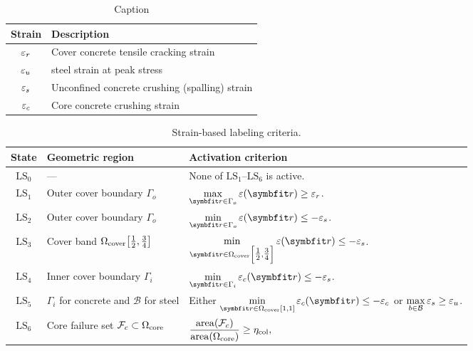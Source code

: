 \begin{table}[H]
    \centering
    \caption{Caption}
    \label{tab:placeholder}
    \begin{tabular}{cl}
    \toprule 
    Strain & Description \\
    \midrule
        $\varepsilon_{r}$ &  Cover concrete tensile cracking strain\\
        $\varepsilon_{u}$ & steel strain at peak stress \\
        $\varepsilon_{s}$ & Unconfined concrete crushing (spalling) strain \\
        $\varepsilon_{c}$ & Core concrete crushing strain \\
    \bottomrule
    \end{tabular}
\end{table}

\begin{table}[H]
\caption{Strain-based labeling criteria.}
\label{tab:DSS}
\small
\setlength{\tabcolsep}{5pt}
\renewcommand{\arraystretch}{1.25}
\begin{tabularx}{\linewidth}{@{}cYY@{}}
\toprule
State & Geometric region & Activation criterion \\
\midrule
$\mathrm{LS}_{0}$
& ---
& None of $\mathrm{LS}_{1}$--$\mathrm{LS}_{6}$ is active. \\

\addlinespace[2pt]
$\mathrm{LS}_{1}$
& Outer cover boundary \(\Gamma_o\)
& \(\displaystyle \max_{\bm r\in\Gamma_o}\varepsilon(\bm r)\ge \StrainCoverCrack\). \\

\addlinespace[2pt]
$\mathrm{LS}_{2}$
& Outer cover boundary \(\Gamma_o\)
& \(\displaystyle \min_{\bm r\in\Gamma_o}\varepsilon(\bm r)\le -\StrainCoverCrush\). \\

\addlinespace[2pt]
$\mathrm{LS}_{3}$
& Cover band \(\displaystyle \Omega_{\mathrm{cover}}\!\left[\tfrac12,\tfrac34\right]\)
& \(\displaystyle \min_{\bm r\in \SectionCover\left[\tfrac12,\tfrac34\right]}\varepsilon(\bm r)\le -\StrainCoverCrush\). \\

\addlinespace[2pt]
$\mathrm{LS}_{4}$
& Inner cover boundary \(\Gamma_i\)
& \(\displaystyle \min_{\bm r\in\Gamma_i}\varepsilon_c(\bm r)\le -\StrainCoverCrush\). \\

\addlinespace[2pt]
$\mathrm{LS}_{5}$
& \(\Gamma_i\) for concrete and \(\mathcal B\) for steel
& Either \(\displaystyle \min_{\bm r\in \SectionCover[1,1]}\varepsilon_c(\bm r)\le -\StrainCoreCrush
\)
  or \(\displaystyle \max_{b\in\mathcal B}\varepsilon_{s}\ge \varepsilon_{u}\). \\

\addlinespace[2pt]
$\mathrm{LS}_{6}$
& Core failure set \(\mathcal F_c\subset\Omega_{\mathrm{core}}\)
& \(\displaystyle
\frac{\operatorname{area}(\mathcal F_c)}{\operatorname{area}(\Omega_{\mathrm{core}})}
\ge \eta_{\mathrm{col}},
\) 
\\
\bottomrule
\end{tabularx}
\end{table}

